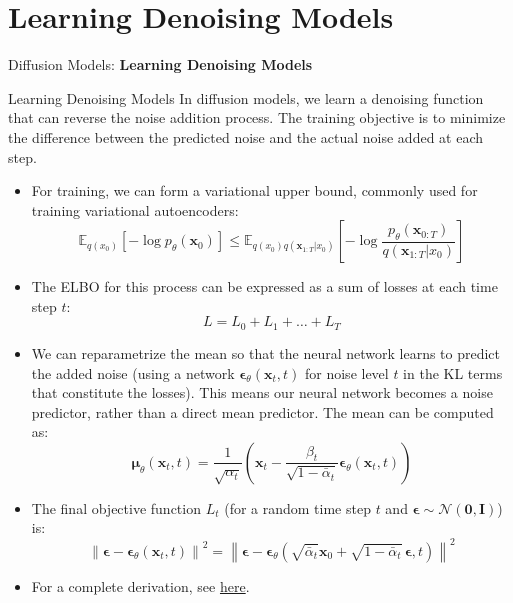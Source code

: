\section{Learning Denoising Models}
\begin{frame}{}
    \LARGE Diffusion Models: \textbf{Learning Denoising Models}
\end{frame}


\begin{frame}[allowframebreaks]{Learning Denoising Models}
In diffusion models, we learn a denoising function that can reverse the noise addition process. The training objective is to minimize the difference between the predicted noise and the actual noise added at each step.
\begin{itemize}
    \item For training, we can form a variational upper bound, commonly used for training variational autoencoders:
    $$
    \mathbb{E}_{q(x_0)} \left[-\log p_\theta(\mathbf{x}_0)\right] \leq \mathbb{E}_{q(x_0)q(\mathbf{x}_{1:T}|x_0)} \left[ -\log\frac{p_\theta(\mathbf{x}_{0:T})}{q(\mathbf{x}_{1:T}|x_0)} \right]
    $$
    \item The ELBO for this process can be expressed as a sum of losses at each time step $t$:
    $$
    L = L_0 + L_1 + \dots + L_T
    $$
\end{itemize}

\framebreak

\begin{itemize}
    \item We can reparametrize the mean so that the neural network learns to predict the added noise (using a network $\mathbf{\epsilon}_\theta(\mathbf{x}_t, t)$ for noise level $t$ in the KL terms that constitute the losses). This means our neural network becomes a noise predictor, rather than a direct mean predictor. The mean can be computed as:
    $$
    \mathbf{\mu}_\theta(\mathbf{x}_t, t) = \frac{1}{\sqrt{\alpha_t}} \left(  \mathbf{x}_t - \frac{\beta_t}{\sqrt{1- \bar{\alpha}_t}} \mathbf{\epsilon}_\theta(\mathbf{x}_t, t) \right)
    $$
    \item The final objective function $L_t$ (for a random time step $t$ and $\mathbf{\epsilon} \sim \mathcal{N}(\mathbf{0}, \mathbf{I})$) is:
    $$
    \left\| \mathbf{\epsilon} - \mathbf{\epsilon}_\theta(\mathbf{x}_t, t) \right\|^2 = \left\| \mathbf{\epsilon} - \mathbf{\epsilon}_\theta\left( \sqrt{\bar{\alpha}_t} \mathbf{x}_0 + \sqrt{1- \bar{\alpha}_t} \, \mathbf{\epsilon}, t \right) \right\|^2
    $$
    \item For a complete derivation, see \href{https://lilianweng.github.io/posts/2021-07-11-diffusion-models/}{here}.
\end{itemize}
\end{frame}